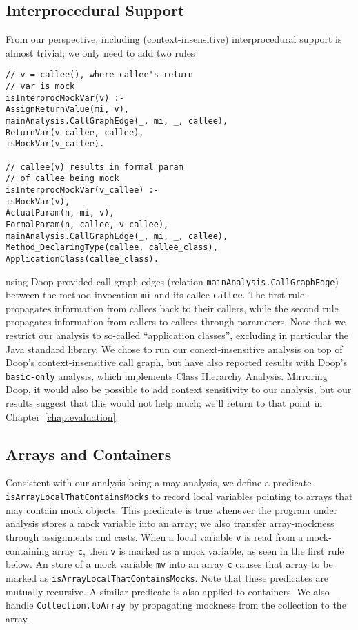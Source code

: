 \subsection{Interprocedural Support} 

From our perspective, including (context-insensitive) interprocedural support is almost trivial; we only need to add two rules
\begin{lstlisting}[basicstyle=\ttfamily\small,numbers=none]
// v = callee(), where callee's return 
// var is mock
isInterprocMockVar(v) :-
AssignReturnValue(mi, v),
mainAnalysis.CallGraphEdge(_, mi, _, callee),
ReturnVar(v_callee, callee),
isMockVar(v_callee).

// callee(v) results in formal param 
// of callee being mock
isInterprocMockVar(v_callee) :-
isMockVar(v),
ActualParam(n, mi, v),
FormalParam(n, callee, v_callee),
mainAnalysis.CallGraphEdge(_, mi, _, callee),
Method_DeclaringType(callee, callee_class),
ApplicationClass(callee_class).
\end{lstlisting}
using Doop-provided call graph edges (relation \texttt{mainAnalysis.CallGraphEdge}) between the method invocation {\tt mi} and its callee {\tt callee}. The first rule propagates information from callees back to their callers, while the second rule propagates information from callers to callees through parameters. Note that we restrict our analysis to so-called ``application classes'', excluding in particular the Java standard library. We chose to run our conext-insensitive analysis on top of Doop's context-insensitive call graph, but have also reported results with Doop's \texttt{basic-only} analysis, which implements Class Hierarchy Analysis. Mirroring Doop, it would also be possible to add context sensitivity to our analysis, but our results suggest that this would not help much; we'll return to that point in Chapter~\ref{chap:evaluation}.

\subsection{Arrays and Containers} 

Consistent with our analysis being a may-analysis, we define a predicate \\ {\tt isArrayLocalThatContainsMocks} to record local variables pointing to arrays that may contain mock objects. This predicate is true whenever the program under analysis stores a mock variable into an array; we also transfer array-mockness through assignments and casts. When a local variable \texttt{v} is read from a mock-containing array \texttt{c}, then \texttt{v} is marked as a mock variable, as seen in the first rule below. An store of a mock variable \texttt{mv} into an array \texttt{c} causes that array to be marked as \texttt{isArrayLocalThatContainsMocks}. Note that these predicates are mutually recursive. A similar predicate is also applied to containers. We also handle {\tt Collection.toArray} by propagating mockness from the collection to the array.

